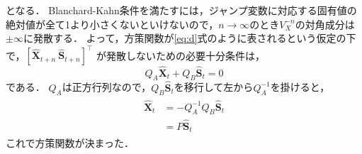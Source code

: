 \documentclass[dvipdfmx]{jlreq}
\begin{document}
となる．
Blanchard-Kahn条件を満たすには，ジャンプ変数に対応する固有値の絶対値が全て1より小さくないといけないので，$n \rightarrow \infty$のとき$V_X^{-n}$の対角成分は$\pm \infty$に発散する．
よって，方策関数が\eqref{eq:d}式のように表されるという仮定の下で，$[\widehat{\boldsymbol{X}}_{t+n} \ \widehat{\boldsymbol{S}}_{t+n}]^\top$
が発散しないための必要十分条件は，
\begin{equation}
  Q_A \widehat{\boldsymbol{X}}_t + Q_B \widehat{\boldsymbol{S}}_t = 0
\end{equation}
である．
$Q_A$は正方行列なので，$Q_B \widehat{\boldsymbol{S}}_t$を移行して左から$Q_A^{-1}$を掛けると，
\begin{align}
  \begin{split}
  \widehat{\boldsymbol{X}}_t &= - Q_A^{-1} Q_B \widehat{\boldsymbol{S}}_t \\
  &= P \widehat{\boldsymbol{S}}_t
  \end{split}
\end{align}
これで方策関数が決まった．
\end{document}
